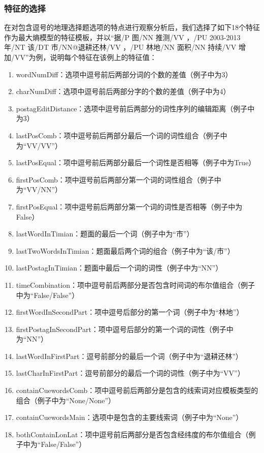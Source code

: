 \documentclass[master, winfont]{njuthesis}
\begin{document}
\subsubsection{特征的选择}
\label{featuresection}
在对包含逗号的地理选择题选项的特点进行观察分析后，我们选择了如下18个特征作为最大熵模型的特征模板，并以“据/P 图/NN 推测/VV ，/PU 2003-2013年/NT 该/DT 市/NN@退耕还林/VV ，/PU 林地/NN 面积/NN 持续/VV 增加/VV”为例，说明每个特征在该例上的特征值：
\begin{enumerate}
  \item wordNumDiff：选项中逗号前后两部分词的个数的差值（例子中为3）
  \item charNumDiff：选项中逗号前后两部分字的个数的差值（例子中为4）
  \item postagEditDistance：选项中逗号前后两部分的词性序列的编辑距离（例子中为3）
  \item lastPosComb：项中逗号前后两部分最后一个词的词性组合（例子中为“VV/VV”）
  \item lastPosEqual：项中逗号前后两部分最后一个词性是否相等（例子中为True）
  \item firstPosComb：项中逗号前后两部分第一个词的词性组合（例子中为“VV/NN”）
  \item firstPosEqual：项中逗号前后两部分第一个词的词性是否相等（例子中为False）
  \item lastWordInTimian：题面的最后一个词（例子中为“市”）
  \item lastTwoWordsInTimian：题面最后两个词的组合（例子中为“该/市”）
  \item lastPostagInTimian：题面中最后一个词的词性（例子中为“NN”）
  \item timeCombination：项中逗号前后两部分是否包含时间词的布尔值组合（例子中为“False/False”）
  \item firstWordInSecondPart：项中逗号后部分的第一个词（例子中为“林地”）
  \item firstPostagInSecondPart：项中逗号后部分的第一个词的词性（例子中为“NN”）
  \item lastWordInFirstPart：逗号前部分的最后一个词（例子中为“退耕还林”）
  \item lastCharInFirstPart：逗号前部分的最后一个词的词性（例子中为“VV”）
  \item containCuewordsComb：项中逗号前后两部分是包含的线索词对应模板类型的组合（例子中为“None/None”）
  \item containCuewordsMain：选项中是包含的主要线索词（例子中为“None”）
  \item bothContainLonLat：项中逗号前后两部分是否包含经纬度的布尔值组合（例子中为“False/False”）
\end{enumerate}
\end{document}
